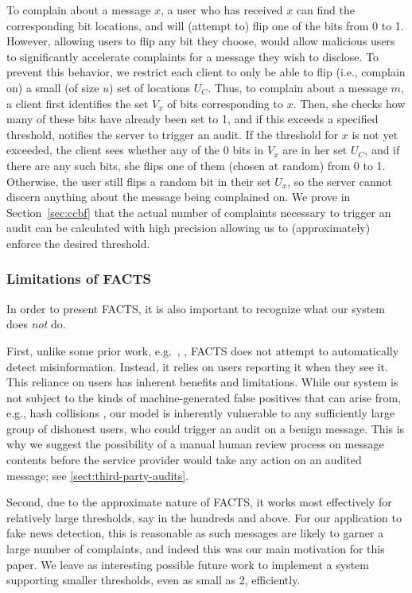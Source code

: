 To complain about a message $x$, a user who has received $x$ can find the corresponding bit locations, and will (attempt to) flip one of the bits from 0 to 1.  However, allowing users to flip any bit they choose, would allow malicious users to significantly accelerate complaints for a message they wish to disclose.  To prevent this behavior, we restrict each client to only be able to flip (i.e., complain on) a small (of size $u$) set of locations $U_C$.  Thus, to complain about a message $m$, a client first identifies the set $V_x$ of bits corresponding to $x$.  Then, she checks how many of these bits have already been set to 1, and if this exceeds a specified threshold, notifies the server to trigger an audit.  If the threshold for $x$ is not yet exceeded, the client sees whether any of the 0 bits in $V_x$ are in her set $U_C$, and if there are any such bits, she flips one of them (chosen at random) from 0 to 1.  Otherwise, the user still flips a random bit in their set $U_x$, so the server cannot discern anything about the message being complained on. We prove in Section~\ref{sec:ccbf} that the actual number of complaints necessary to trigger an audit can be calculated with high precision allowing us to (approximately) enforce the desired threshold.

\subsubsection{Limitations of FACTS}
In order to present FACTS, it is also important to recognize what our system does \emph{not} do.

First, unlike some prior work, e.g.~\cite{ICS:Geiger16},%
\cite{km-private-membership-usenix21}, FACTS does not attempt to automatically detect misinformation.  Instead, it relies on users reporting it when they see it.
This reliance on users has inherent benefits and limitations.
While our system is not subject to the kinds of machine-generated false positives
that can arise from, e.g., hash collisions
\cite{brandom-verge-apple-csam},
our model is inherently vulnerable to any sufficiently large group of dishonest users, who could trigger an audit on a benign message.
This is why we suggest the possibility of a manual human review process on message contents before the service provider would take any action on an audited message; see \cref{sect:third-party-audits}.

Second, due to the approximate nature of FACTS, it works most effectively for relatively large thresholds, say in the hundreds and above.  For our application to fake news detection, this is reasonable as such messages are likely to garner a large number of complaints, and indeed this was our main motivation for this paper. We leave as interesting possible future work to implement a system supporting smaller thresholds, even as small as 2, efficiently.

